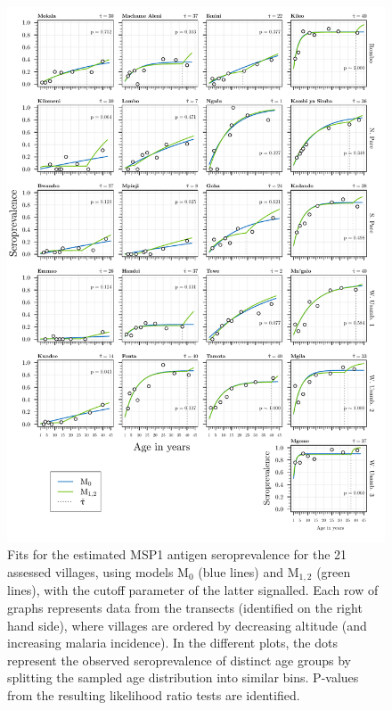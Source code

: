 \begin{figure}[H]
\center
\begin{adjustbox}{width=\linewidth,totalheight=\baselineskip}
\includegraphics[width=\columnwidth]{images/Seroprevalence_M0vM12_msp1.pdf}
\end{adjustbox}
\caption[Estimated MSP1 seroprevalence for models M$_0$ and M$_{1,2}$]{Fits for the estimated MSP1 antigen seroprevalence for the 21 assessed villages, using models M$_0$ (blue lines) and M$_{1,2}$ (green lines), with the cutoff parameter of the latter signalled. Each row of graphs represents data from the transects (identified on the right hand side), where villages are ordered by decreasing altitude (and increasing malaria incidence). In the different plots, the dots represent the observed seroprevalence of distinct age groups by splitting the sampled age distribution into similar bins. P-values from the resulting likelihood ratio tests are identified.}
\label{fig:msp1.seroprevalence.M0.M12}
\end{figure}


